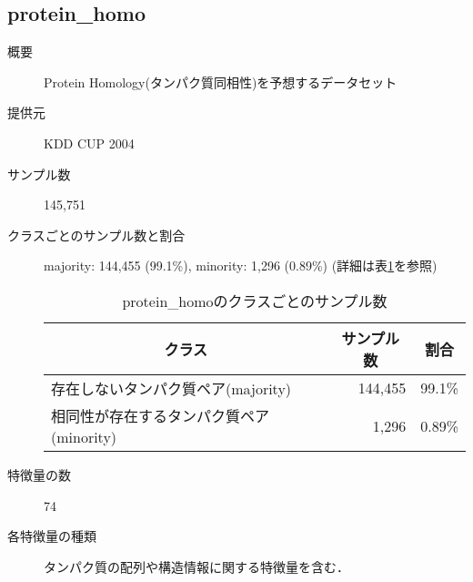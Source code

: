\subsection{protein\_homo}
\begin{description}
    \item[概要] Protein Homology(タンパク質同相性)を予想するデータセット\cite{proteinhomo}
    \item[提供元] KDD CUP 2004
    \item[サンプル数] 145,751
    \item[クラスごとのサンプル数と割合] majority: 144,455 (99.1\%), minority: 1,296 (0.89\%) (詳細は表\ref{tab:proteinhomo}を参照)

        \begin{table}[htbp]
            \centering
            \caption{protein\_homoのクラスごとのサンプル数}
            \label{tab:proteinhomo}
            \begin{tabular}{lrc} \hline
                \multicolumn{1}{c}{クラス}&
                \multicolumn{1}{c}{サンプル数}&
                \multicolumn{1}{c}{割合}\\
                \hline
                \hline
                存在しないタンパク質ペア(majority)&144,455&99.1\%\\
                相同性が存在するタンパク質ペア(minority)&1,296&0.89\%\\
                \hline
            \end{tabular}
        \end{table}

    \item[特徴量の数] 74
    \item[各特徴量の種類] タンパク質の配列や構造情報に関する特徴量を含む．
\end{description}


\newpage